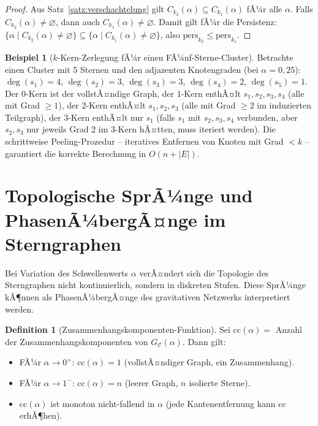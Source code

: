 ﻿\documentclass[a4paper,12pt]{report}
\theoremstyle{definition}
\newtheorem{definition}{Definition}
\newtheorem{beispiel}{Beispiel}
\begin{document}
\begin{proof}
Aus Satz~\ref{satz:verschachtelung} gilt $C_{k_2}(\alpha) \subseteq C_{k_1}(\alpha)$ fÃ¼r alle $\alpha$. Falls $C_{k_2}(\alpha) \neq \varnothing$, dann auch $C_{k_1}(\alpha) \neq \varnothing$. Damit gilt fÃ¼r die Persistenz:
$\{\alpha \mid C_{k_2}(\alpha) \neq \varnothing\} \subseteq \{\alpha \mid C_{k_1}(\alpha) \neq \varnothing\}$,
also $\mathrm{pers}_{k_2} \leq \mathrm{pers}_{k_1}$.
\end{proof}

\begin{beispiel}[$k$-Kern-Zerlegung fÃ¼r einen FÃ¼nf-Sterne-Cluster]
\label{bsp:kcore}
Betrachte einen Cluster mit 5 Sternen und den adjazenten Knotengraden (bei $\alpha = 0{,}25$):
$\deg(s_1) = 4$, $\deg(s_2) = 3$, $\deg(s_3) = 3$, $\deg(s_4) = 2$, $\deg(s_5) = 1$.
Der $0$-Kern ist der vollstÃ¤ndige Graph, der $1$-Kern enthÃ¤lt $s_1, s_2, s_3, s_4$ (alle mit Grad $\geq 1$), der $2$-Kern enthÃ¤lt $s_1, s_2, s_3$ (alle mit Grad $\geq 2$ im induzierten Teilgraph), der $3$-Kern enthÃ¤lt nur $s_1$ (falls $s_1$ mit $s_2, s_3, s_4$ verbunden, aber $s_2, s_3$ nur jeweils Grad 2 im $3$-Kern hÃ¤tten, muss iteriert werden). Die schrittweise Peeling-Prozedur -- iteratives Entfernen von Knoten mit Grad $< k$ -- garantiert die korrekte Berechnung in $O(n + |E|)$.
\end{beispiel}

\section{Topologische SprÃ¼nge und PhasenÃ¼bergÃ¤nge im Sterngraphen}
\label{sec:phasenuebergaenge}

Bei Variation des Schwellenwerts $\alpha$ verÃ¤ndert sich die Topologie des Sterngraphen nicht kontinuierlich, sondern in diskreten Stufen. Diese SprÃ¼nge kÃ¶nnen als PhasenÃ¼bergÃ¤nge des gravitativen Netzwerks interpretiert werden.

\begin{definition}[Zusammenhangskomponenten-Funktion]
\label{def:zusammenhang}
Sei $\mathrm{cc}(\alpha) = $ Anzahl der Zusammenhangskomponenten von $G_\mathcal{C}(\alpha)$. Dann gilt:
\begin{itemize}
    \item FÃ¼r $\alpha \to 0^+$: $\mathrm{cc}(\alpha) = 1$ (vollstÃ¤ndiger Graph, ein Zusammenhang).
    \item FÃ¼r $\alpha \to 1^-$: $\mathrm{cc}(\alpha) = n$ (leerer Graph, $n$ isolierte Sterne).
    \item $\mathrm{cc}(\alpha)$ ist monoton nicht-fallend in $\alpha$ (jede Kantenentfernung kann $\mathrm{cc}$ erhÃ¶hen).
\end{itemize}
\end{definition}
\end{document}
